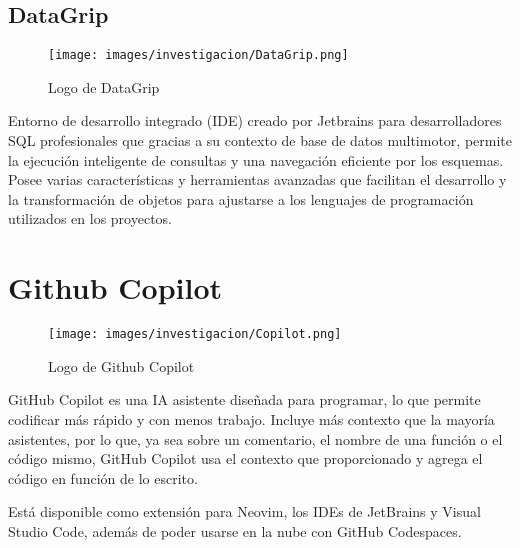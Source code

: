         \subsection{DataGrip}

            \nocite{Jetbrains-DataGrip}

            \begin{figure*}[h]
            \label{figura:datagrip}

                \centering
                \texttt{[image: images/investigacion/DataGrip.png]}
                \caption{Logo de DataGrip}

            \end{figure*}


        Entorno de desarrollo integrado (IDE) creado por Jetbrains para desarrolladores SQL profesionales que gracias a su contexto de base de datos multimotor, permite la ejecución inteligente de consultas y una navegación eficiente por los esquemas. Posee varias características y herramientas avanzadas que facilitan el desarrollo y la transformación de objetos para ajustarse a los lenguajes de programación utilizados en los proyectos.




    \section{Github Copilot}

        \nocite{Copilot}

        \begin{figure*}[h]
        \label{figura:copilot}

            \centering
            \texttt{[image: images/investigacion/Copilot.png]}
            \caption{Logo de Github Copilot}

        \end{figure*}

        GitHub Copilot es una IA asistente diseñada para programar, lo que permite codificar más rápido y con menos trabajo. Incluye más contexto que la mayoría asistentes, por lo que, ya sea sobre un comentario, el nombre de una función o el código mismo, GitHub Copilot usa el contexto que proporcionado y agrega el código en función de lo escrito.

        Está disponible como extensión para Neovim, los IDEs de JetBrains y Visual Studio Code, además de poder usarse en la nube con GitHub Codespaces.

